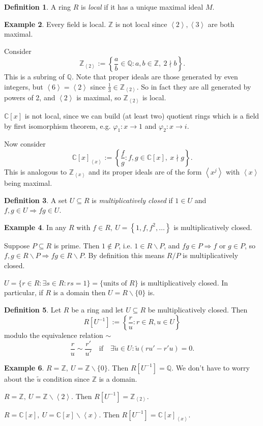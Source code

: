 \documentclass[a4paper]{article}
\newcommand{\la}{\left\langle}
\newcommand{\ra}{\right\rangle}
\newcommand{\Z}{\mathbb Z}
\newcommand{\Q}{\mathbb Q}
\newcommand{\C}{\mathbb C}
\theoremstyle{definition}
\newtheorem{defn}{Definition}[subsection]
\newtheorem{example}[defn]{Example}
\begin{document}
\begin{defn}
A ring $R$ is \textit{local} if it has a unique maximal ideal $M$.
\end{defn}
\begin{example}
\label{example:nonexampleLocal}
Every field is local. $\Z$ is not local since $\la2\ra,\la 3\ra$ are both maximal.

Consider
\[
\Z_{\la 2\ra}:=\left\{ \frac{a}{b}\in\Q:a,b\in\Z,\ 2\nmid b \right\}.
\]
This is a subring of $\Q$. Note that proper ideals are those generated by even integers, but $\la 6\ra=\la 2\ra$ since $\frac13 \in \Z_{\la 2\ra}$. So in fact they are all generated by powers of 2, and $\la 2\ra$ is maximal, so $\Z_{\la 2\ra}$ is local.

$\C[x]$ is not local, since we can build (at least two) quotient rings which is a field by first isomorphism theorem, e.g. $\varphi_1 :x\rightarrow 1$ and $\varphi_2 :x\rightarrow i$.

Now consider
\[
\C[x]_{\la x\ra}:= \left\{ \frac{f}{g}:f,g\in\C[x],\ x\nmid g \right\}.
\]
This is analogous to $\Z_{\la x\ra}$ and its proper ideals are of the form $\la x^j\ra$ with $\la x\ra$ being maximal.
\end{example}
\begin{defn}
A set $U\subseteq R$ is \textit{multiplicatively closed} if $1\in U$ and $f,g\in U\Rightarrow fg\in U$.
\end{defn}
\begin{example}
In any $R$ with $f\in R,\ U=\left\{1,f,f^2,\ldots\right\}$ is multiplicatively closed. 

Suppose $P\subseteq R$ is prime. Then $1\notin P$, i.e. $1\in R\backslash P$, and $fg\in P\Rightarrow f$ or $g \in P$, so $f,g\in R\backslash P\Rightarrow fg\in R\backslash P$. By definition this means $R/P$ is multiplicatively closed.

$U=\{r\in R:\exists s\in R:rs=1\}=\{\text{units of }R\}$ is multiplicatively closed. In particular, if $R$ is a domain then $U=R\backslash\{0\}$ is.
\end{example}

\begin{defn}
\label{defn:localisation}
Let $R$ be a ring and let $U\subseteq R$ be multiplicatively closed. Then
\[
R\left[U^{-1}\right]:=\left\{ \frac{r}{u}:r\in R,u\in U \right\}
\]
modulo the equivalence relation $\sim$
\[
\frac{r}{u}\sim\frac{r'}{u'} \quad\text{if}\quad \exists \widetilde u \in U : \widetilde u(ru'-r'u)=0.
\]
\end{defn}
\begin{example}
$R=\Z,\ U=\Z\backslash\{0\}$. Then $R\left[U^{-1}\right]=\Q$. We don't have to worry about the $\widetilde u$ condition since $\Z$ is a domain.

$R=\Z,\ U=\Z\backslash \la 2\ra$. Then $R[U^{-1}]=\Z_{\la 2\ra}$.

$R=\C[x],\ U=\C[x]\backslash \la x\ra$. Then $R[U^{-1}]=\C[x]_{\la x\ra}$.
\end{example}
\end{document}

